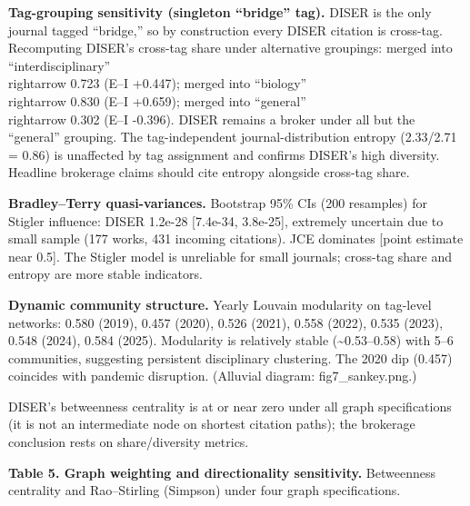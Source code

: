 \documentclass[pdflatex,sn-apa]{sn-jnl}
\begin{document}
\textbf{Tag-grouping sensitivity (singleton ``bridge'' tag).} DISER is
the only journal tagged ``bridge,'' so by construction every DISER
citation is cross-tag. Recomputing DISER's cross-tag share under
alternative groupings: merged into ``interdisciplinary'' \\rightarrow 0.723 (E--I
+0.447); merged into ``biology'' \\rightarrow 0.830 (E--I +0.659); merged into
``general'' \\rightarrow 0.302 (E--I -0.396). DISER remains a broker under all but
the ``general'' grouping. The tag-independent journal-distribution
entropy (2.33/2.71 = 0.86) is unaffected by tag assignment and confirms
DISER's high diversity. Headline brokerage claims should cite entropy
alongside cross-tag share.

\textbf{Bradley--Terry quasi-variances.} Bootstrap 95\% CIs (200
resamples) for Stigler influence: DISER 1.2e-28 {[}7.4e-34, 3.8e-25{]},
extremely uncertain due to small sample (177 works, 431 incoming
citations). JCE dominates {[}point estimate near 0.5{]}. The Stigler
model is unreliable for small journals; cross-tag share and entropy are
more stable indicators.

\textbf{Dynamic community structure.} Yearly Louvain modularity on
tag-level networks: 0.580 (2019), 0.457 (2020), 0.526 (2021), 0.558
(2022), 0.535 (2023), 0.548 (2024), 0.584 (2025). Modularity is
relatively stable (\textasciitilde0.53--0.58) with 5--6 communities,
suggesting persistent disciplinary clustering. The 2020 dip (0.457)
coincides with pandemic disruption. (Alluvial diagram:
fig7\_sankey.png.)

DISER's betweenness centrality is at or near zero under all graph
specifications (it is not an intermediate node on shortest citation
paths); the brokerage conclusion rests on share/diversity metrics.

\textbf{Table 5. Graph weighting and directionality sensitivity.}
Betweenness centrality and Rao--Stirling (Simpson) under four graph
specifications.
\end{document}
